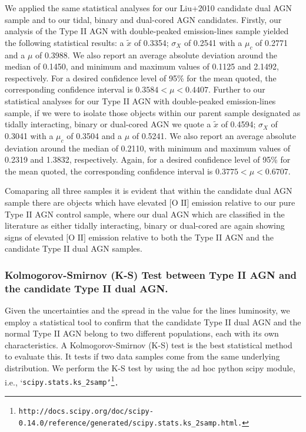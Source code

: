 We applied the same statistical analyses for our Liu+2010 candidate dual AGN sample and to our tidal, binary and dual-cored AGN candidates. Firstly, our analysis of the Type II AGN with double-peaked emission-lines sample yielded the following statistical results: a $\tilde{x}$ of 0.3354; $\sigma_{X}$ of 0.2541 with a $\mu_{c}$ of 0.2771 and a $\mu$ of 0.3988. We also report an average absolute deviation around the median of 0.1450, and minimum and maximum values of 0.1125 and 2.1492, respectively. For a desired confidence level of 95\% for the mean quoted, the corresponding confidence interval is ${0.3584}<{\mu}<{0.4407}$. Further to our statistical analyses for our Type II AGN with double-peaked emission-lines sample, if we were to isolate those objects within our parent sample designated as tidally interacting, binary or dual-cored AGN we quote a $\tilde{x}$ of 0.4594; $\sigma_{X}$ of 0.3041 with a $\mu_{c}$ of 0.3504 and a $\mu$ of 0.5241. We also report an average absolute deviation around the median of 0.2110, with minimum and maximum values of 0.2319 and 1.3832, respectively. Again, for a desired confidence level of 95\% for the mean quoted, the corresponding confidence interval is ${0.3775}<{\mu}<{0.6707}$.

Comaparing all three samples it is evident that within the candidate dual AGN sample there are objects which have elevated $\text{[O II]}$ emission relative to our pure Type II AGN control sample, where our dual AGN which are classified in the literature as either tidally interacting, binary or dual-cored are again showing signs of elevated $\text{[O II]}$ emission relative to both the Type II AGN and the candidate Type II dual AGN samples.
 
\subsubsection{Kolmogorov-Smirnov (K-S) Test between Type II AGN and the candidate Type II dual AGN.}

Given the uncertainties and the spread in the value for the lines luminosity, we employ a statistical tool to confirm that the candidate Type II dual AGN and the normal Type II AGN belong to two different populations, each with its own characteristics. A Kolmogorov-Smirnov (K-S) test is the best statistical method to evaluate this. It tests if two data samples come from the same underlying distribution. We perform the K-S test by using the ad hoc python scipy module, i.e., `\tt{scipy.stats.ks_2samp}'\footnote{\tiny{\tt{http://docs.scipy.org/doc/scipy-0.14.0/reference/generated/scipy.stats.ks_2samp.html}.}}.

